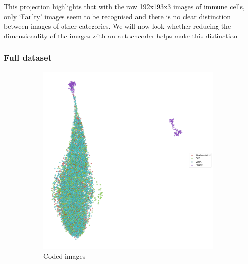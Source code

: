 This projection highlights that with the raw 192x193x3 images of immune cells, only `Faulty' images seem to be recognised and there is no clear distinction between images of other categories. We will now look whether reducing the dimensionality of the images with an autoencoder helps make this distinction.

\bigskip
\subsubsection{Full dataset}
\hfill
\hfill

\begin{figure}[h!]
    \centering
    \begin{subfigure}[h!]{0.45\textwidth}
        \includegraphics[width=\textwidth]{dissertation/figures/CK19_baseline_visualisation.png}
        \caption{Coded images}
    \end{subfigure}
    \begin{subfigure}[h!]{0.45\textwidth}

\end{subfigure}
\end{figure}
